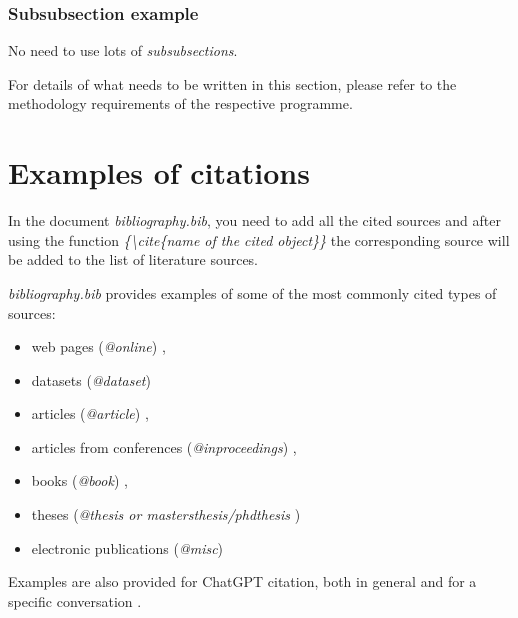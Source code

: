\documentclass[]{VUMIFTemplateClass}
\begin{document}
\subsubsection{Subsubsection example}
\noindent No need to use lots of \textit{subsubsections}.

For details of what needs to be written in this section, please refer to the methodology requirements of the respective programme. 

\printbibliography[title = {References and sources}]


\appendix
\renewcommand{\thesection}{Appendix \arabic{section}. }

\section{\phantom{Appendix} Examples of citations}
In the document \textit{bibliography.bib}, you need to add all the cited sources and after using the function \textit{\{\textbackslash cite\{name of the cited object\}\}} the corresponding source will be added to the list of literature sources.


\textit{bibliography.bib} provides examples of some of the most commonly cited types of sources:
\begin{itemize}
    \item web pages (\textit{@online}) \cite{PvzInternetinisPuslapis},
    \item datasets (\textit{@dataset}) \cite{dataset}
    \item articles (\textit{@article}) \cite{PvzStraipsnLt, PvzStraipsnEn}, 
    \item articles from conferences (\textit{@inproceedings}) \cite{PvzKonfLt, PvzKonfEn}, 
    \item books (\textit{@book}) \cite{PvzKnygLt, PvzKnygEn}, 
    \item theses (\textit{@thesis or mastersthesis/phdthesis} \cite{PvzMagistrLt, PvzPhdEn})
    \item electronic publications (\textit{@misc}) \cite{PvzElPubLt, PvzElPubEn}
\end{itemize}

Examples are also provided for ChatGPT citation, both in general \cite{chatgpt_bendrai} and for a specific conversation \cite{chatgpt_pokalbis}.
\end{document}
